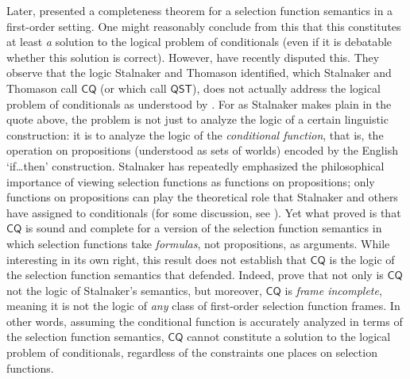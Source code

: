 \documentclass[12pt]{article}
\begin{document}
Later, \cite{StalnakerThomason1970} presented a completeness theorem for a selection function semantics in a first-order setting. 
One might reasonably conclude from this that this constitutes at least \emph{a} solution to the logical problem of conditionals (even if it is debatable whether this solution is correct). 
However, \cite{KocurekWalshWeissA} have recently disputed this. %
They observe that the logic Stalnaker and Thomason identified, which Stalnaker and Thomason call $\mathsf{CQ}$ (or which \cite{KocurekWalshWeissA} call $\mathsf{QST}$), does not actually address the logical problem of conditionals as understood by \cite{Stalnaker1968theory}. %
For as Stalnaker makes plain in the quote above, the problem is not just to analyze the logic of a certain linguistic construction: it is to analyze the logic of the \emph{conditional function}, that is, the operation on propositions (understood as sets of worlds) encoded by the English `if\dots then' construction. 
Stalnaker has repeatedly emphasized the philosophical importance of viewing selection functions as functions on propositions; only functions on propositions can play the theoretical role that Stalnaker and others have assigned to conditionals (for some discussion, see \cite[Section~1]{KocurekWalshWeissA}). Yet what \cite{StalnakerThomason1970} proved is that $\mathsf{CQ}$ is sound and complete for a version of the selection function semantics in which selection functions take \emph{formulas}, not propositions, as arguments. 
While interesting in its own right, this result does not establish that $\mathsf{CQ}$ is the logic of the selection function semantics that \cite{Stalnaker1968theory} defended. 
Indeed, \cite{KocurekWalshWeissA} prove that not only is $\mathsf{CQ}$ not the logic of Stalnaker's semantics, but moreover, $\mathsf{CQ}$ is \emph{frame incomplete}, meaning it is not the logic of \emph{any} class of first-order selection function frames. 
In other words, assuming the conditional function is accurately analyzed in terms of the selection function semantics, $\mathsf{CQ}$ cannot constitute a solution to the logical problem of conditionals, regardless of the constraints one places on selection functions. 
\end{document}
